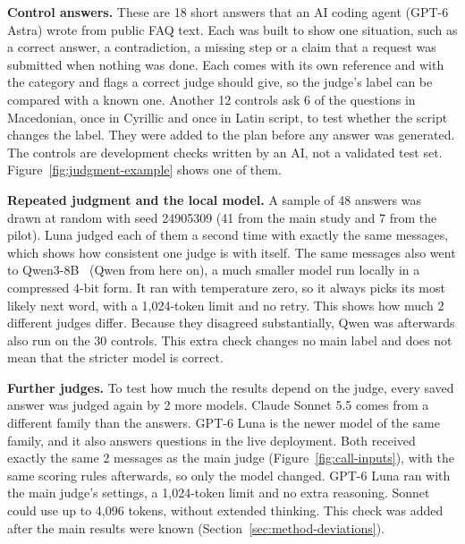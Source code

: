 \textbf{Control answers.} These are 18 short answers that an AI coding agent (GPT-6 Astra) wrote from public FAQ text. Each was built to show one situation, such as a correct answer, a contradiction, a missing step or a claim that a request was submitted when nothing was done. Each comes with its own reference and with the category and flags a correct judge should give, so the judge's label can be compared with a known one. Another 12 controls ask 6 of the questions in Macedonian, once in Cyrillic and once in Latin script, to test whether the script changes the label. They were added to the plan before any answer was generated. The controls are development checks written by an AI, not a validated test set. Figure~\ref{fig:judgment-example} shows one of them.

\textbf{Repeated judgment and the local model.} A sample of 48 answers was drawn at random with seed 24905309 (41 from the main study and 7 from the pilot). Luna judged each of them a second time with exactly the same messages, which shows how consistent one judge is with itself. The same messages also went to Qwen3-8B~\cite{yang2025qwen3} (Qwen from here on), a much smaller model run locally in a compressed 4-bit form. It ran with temperature zero, so it always picks its most likely next word, with a 1,024-token limit and no retry. This shows how much 2 different judges differ. Because they disagreed substantially, Qwen was afterwards also run on the 30 controls. This extra check changes no main label and does not mean that the stricter model is correct.

\textbf{Further judges.} To test how much the results depend on the judge, every saved answer was judged again by 2 more models. Claude Sonnet 5.5 comes from a different family than the answers. GPT-6 Luna is the newer model of the same family, and it also answers questions in the live deployment. Both received exactly the same 2 messages as the main judge (Figure~\ref{fig:call-inputs}), with the same scoring rules afterwards, so only the model changed. GPT-6 Luna ran with the main judge's settings, a 1,024-token limit and no extra reasoning. Sonnet could use up to 4,096 tokens, without extended thinking. This check was added after the main results were known (Section~\ref{sec:method-deviations}).

